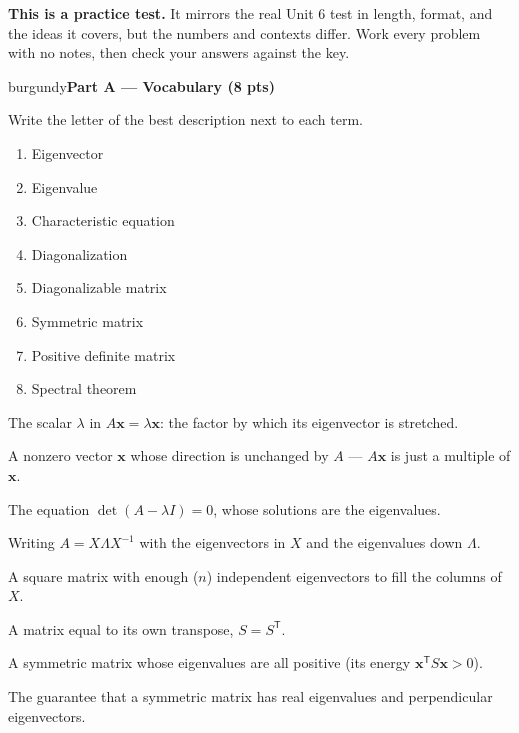\documentclass[10pt]{article}
\newcommand{\xx}{\mathbf{x}}
\newcommand{\T}{^{\mathsf T}}
\newcommand{\parthead}[1]{%
  \vspace{6pt}\noindent
  \begin{headlinebox}{burgundy}{\color{white}\bfseries #1}\end{headlinebox}%
  \vspace{4pt}}
\begin{document}
\namedateperiod

\vspace{0.10in}
\begin{remindbox}
\small
\textbf{This is a practice test.} It mirrors the real Unit 6 test in length, format,
and the ideas it covers, but the numbers and contexts differ. Work every problem
with no notes, then check your answers against the key.
\end{remindbox}

\parthead{Part A --- Vocabulary (8 pts)}
Write the letter of the best description next to each term.

\vspace{4pt}
\noindent
\begin{minipage}[t]{0.40\textwidth}
\begin{enumerate}[leftmargin=2.2em, itemsep=7pt, label=\arabic*.]
  \item Eigenvector 
  \item Eigenvalue 
  \item Characteristic equation 
  \item Diagonalization 
  \item Diagonalizable matrix 
  \item Symmetric matrix 
  \item Positive definite matrix 
  \item Spectral theorem 
\end{enumerate}
\end{minipage}%
\hfill
\begin{minipage}[t]{0.57\textwidth}
\small
\begin{description}[leftmargin=1.4em, itemsep=3pt]
  \item[(A)] The scalar $\lambda$ in $A\xx=\lambda\xx$: the factor by which its eigenvector is stretched.
  \item[(B)] A nonzero vector $\xx$ whose direction is unchanged by $A$ --- $A\xx$ is just a multiple of $\xx$.
  \item[(C)] The equation $\det(A-\lambda I)=0$, whose solutions are the eigenvalues.
  \item[(D)] Writing $A=X\Lambda X^{-1}$ with the eigenvectors in $X$ and the eigenvalues down $\Lambda$.
  \item[(E)] A square matrix with enough ($n$) independent eigenvectors to fill the columns of $X$.
  \item[(F)] A matrix equal to its own transpose, $S=S\T$.
  \item[(G)] A symmetric matrix whose eigenvalues are all positive (its energy $\xx\T S\xx>0$).
  \item[(H)] The guarantee that a symmetric matrix has real eigenvalues and perpendicular eigenvectors.
\end{description}
\end{minipage}
\end{document}
